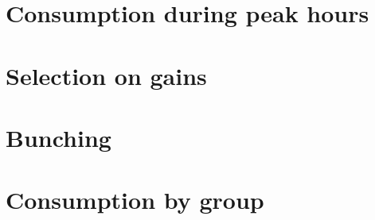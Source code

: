 \documentclass[12pt]{article}
\begin{document}
\begin{appendices}
\section{Consumption during peak hours}

  \setcounter{figure}{0}

  \label{appendix:appendix_peakConsumption}

  

\clearpage

\section{Selection on gains}

\setcounter{figure}{0}

  \label{appendix:appendix_savings}

  

  \clearpage

\section{Bunching}

  \setcounter{figure}{0}

  \label{appendix:appendix_bunching}

  

\clearpage

\section{Consumption by group}

  \setcounter{figure}{0}

  \label{appendix:consumptionByGroup}

  

\clearpage

\end{appendices}
\end{document}
